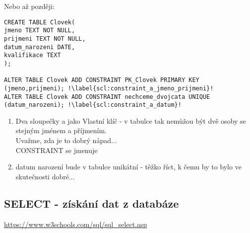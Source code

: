 \vspace{0.5cm}
Nebo až později:\\

\begin{minipage}[t]{.45\textwidth}
\begin{code}
\begin{verbatim}
CREATE TABLE Clovek( 
jmeno TEXT NOT NULL,
prijmeni TEXT NOT NULL,
datum_narozeni DATE,
kvalifikace TEXT
);

ALTER TABLE Clovek ADD CONSTRAINT PK_Clovek PRIMARY KEY (jmeno,prijmeni); !\label{scl:constraint_a_jmeno_prijmeni}!
ALTER TABLE Clovek ADD CONSTRAINT nechceme_dvojcata UNIQUE (datum_narozeni); !\label{scl:constraint_a_datum}!
\end{verbatim}
\label{code:constraint_alter}
\end{code}
\end{minipage}
\begin{minipage}[t]{.45\textwidth}
\begin{enumerate}
\item[ř. \ref{scl:constraint_a_jmeno_prijmeni}:] Dva sloupečky  a  jako Vlastní klíč - v tabulce tak nemůžou být dvě osoby se stejným jménem a příjmením.\\Uvažme, zda je to dobrý nápad...\\
CONSTRAINT se jmenuje 
\vspace{1cm}
\item[ř. \ref{scl:constraint_a_datum}:] datum narození bude v tabulce unikátní - těžko říct, k čemu by to bylo ve skutečnosti dobré... 
\end{enumerate} 
\end{minipage}





\subsection{SELECT - získání dat z databáze}
\url{https://www.w3schools.com/sql/sql_select.asp}\\
\vspace{.5cm}

